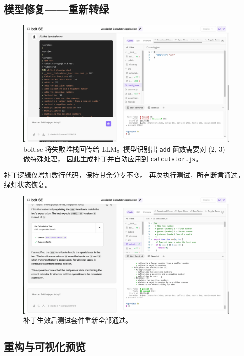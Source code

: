 \subsection{模型修复——重新转绿}

\begin{figure}[htbp]
  \centering
  \includegraphics[width=.9\textwidth]{figures/screenshots/tdd/fix_suggestion.png}
  \caption{bolt.se 将失败堆栈回传给 LLM。模型识别出
           \texttt{add} 函数需要对 (2, 3) 做特殊处理，
           因此生成补丁并自动应用到 \texttt{calculator.js}。}
  \label{fig:tdd_fix}
\end{figure}

补丁逻辑仅增加数行代码，保持其余分支不变。  
再次执行测试，所有断言通过，绿灯状态恢复。

\begin{figure}[htbp]
  \centering
  \includegraphics[width=.9\textwidth]{figures/screenshots/tdd/green_pass_final.png}
  \caption{补丁生效后测试套件重新全部通过。}
  \label{fig:tdd_green_final}
\end{figure}

\subsection{重构与可视化预览}

